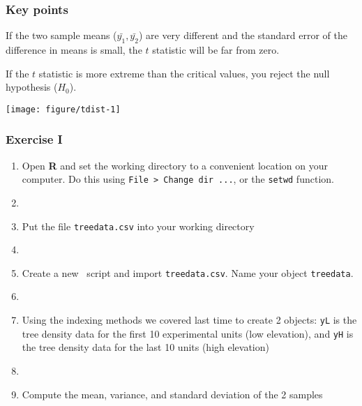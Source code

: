 \documentclass[color=usenames,dvipsnames]{beamer}\usepackage[]{graphicx}\usepackage[]{color}
\newcommand{\inr}[1]{\colorbox{inlinecolor}{\texttt{#1}}}
\begin{document}
\begin{frame}[fragile]
  \frametitle{Key points}

\small
If the two sample means ($\bar{y_1}, \bar{y_2}$) are very
different and the standard error of the difference in means is
small, the $t$ statistic will be far from zero. \\
\pause
\vfill

If the $t$ statistic is more extreme than the critical
    values, you reject the null hypothesis ($H_0$). \\
\pause
    \vfill

    \centering
  \texttt{[image: figure/tdist-1]} \\
\end{frame}






\begin{frame}[fragile]
  \frametitle{Exercise I}
  \begin{enumerate}[\bf (1)]
    \item<1-> Open {\bf R} and set the working directory to a convenient
      location on your computer. Do this using {\tt File > Change dir ...}, or the \inr{setwd} function.
    \item[]
    \item<2-> Put the file {\tt treedata.csv} into your working directory
    \item[]
    \item<3-> Create a new \R~script and import {\tt treedata.csv}. Name your object {\tt treedata}.
    \item[]
    \item<4-> Using the indexing methods we covered last time to
      create 2 objects: \inr{yL} is the tree density data for the
      first 10 experimental units (low elevation), and \inr{yH} is
      the tree density data for the last 10 units (high elevation)
    \item[]
    \item<5-> Compute the mean, variance, and standard deviation of the 2 samples
  \end{enumerate}
\end{frame}
\end{document}
